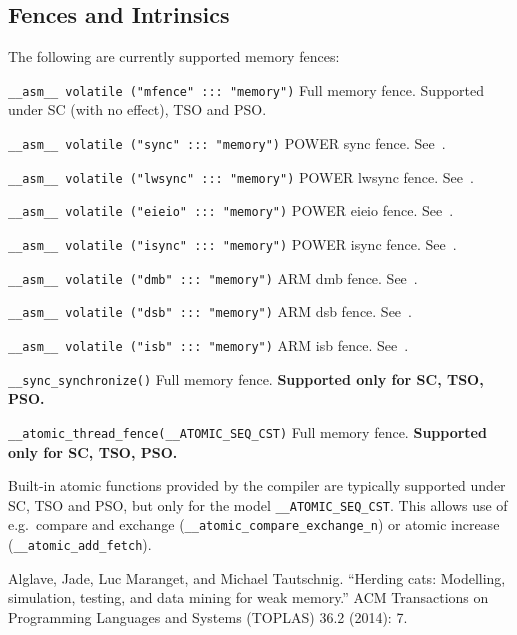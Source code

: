\documentclass[a4paper]{article}
\newcommand{\limitsupport}[1]{\textbf{Supported only for #1.}}
\begin{document}
\subsection{Fences and Intrinsics}

The following are currently supported memory fences:

\begin{description}
\item{\texttt{\_\_asm\_\_ volatile ("mfence" ::: "memory")}} Full
  memory fence. Supported under SC (with no effect), TSO and PSO.
\item{\texttt{\_\_asm\_\_ volatile ("sync" ::: "memory")}} POWER \textsf{sync} fence. See~\cite{alglaveHerding}.
\item{\texttt{\_\_asm\_\_ volatile ("lwsync" ::: "memory")}} POWER \textsf{lwsync} fence. See~\cite{alglaveHerding}.
\item{\texttt{\_\_asm\_\_ volatile ("eieio" ::: "memory")}} POWER \textsf{eieio} fence. See~\cite{alglaveHerding}.
\item{\texttt{\_\_asm\_\_ volatile ("isync" ::: "memory")}} POWER \textsf{isync} fence. See~\cite{alglaveHerding}.
\item{\texttt{\_\_asm\_\_ volatile ("dmb" ::: "memory")}} ARM \textsf{dmb} fence. See~\cite{alglaveHerding}.
\item{\texttt{\_\_asm\_\_ volatile ("dsb" ::: "memory")}} ARM \textsf{dsb} fence. See~\cite{alglaveHerding}.
\item{\texttt{\_\_asm\_\_ volatile ("isb" ::: "memory")}} ARM \textsf{isb} fence. See~\cite{alglaveHerding}.
\item{\texttt{\_\_sync\_synchronize()}} Full memory fence. \limitsupport{SC, TSO, PSO}
\item{\texttt{\_\_atomic\_thread\_fence(\_\_ATOMIC\_SEQ\_CST)}} Full memory fence. \limitsupport{SC, TSO, PSO}
\end{description}

Built-in atomic functions provided by the compiler are typically
supported under SC, TSO and PSO, but only for the model
\texttt{\_\_ATOMIC\_SEQ\_CST}. This allows use of e.g.\ compare and
exchange (\texttt{\_\_atomic\_compare\_exchange\_n}) or atomic
increase (\texttt{\_\_atomic\_add\_fetch}).

\begin{thebibliography}{99}
  Alglave, Jade, Luc Maranget, and Michael Tautschnig. ``Herding cats: Modelling, simulation, testing, and data mining for weak memory.'' ACM Transactions on Programming Languages and Systems (TOPLAS) 36.2 (2014): 7.
\end{thebibliography}
\end{document}
